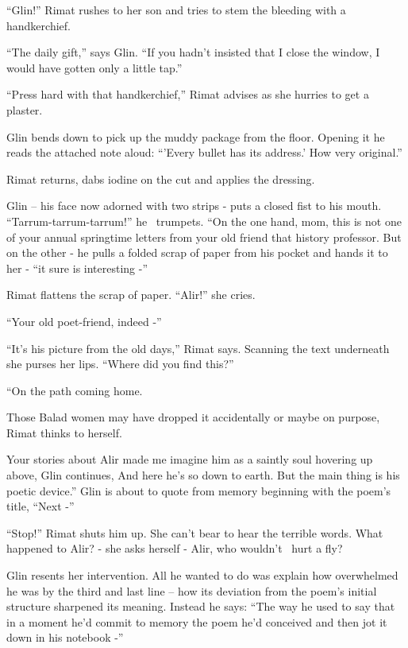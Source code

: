 \documentclass[12pt]{book}
\begin{document}
{{}``Glin!'' Rimat rushes to her son and tries to stem the bleeding
with a handkerchief. }

{{}``The daily gift,'' says Glin. ``If you hadn't insisted }that
{I close the window, I would have gotten only a }little
tap{.'' }

{{}``Press hard with }that
handkerchief,{{}'' Rimat advises as she hurries to get
a}{ }plaster.

{Glin bends down to pick up the muddy
}package{ from the floor. Opening it he reads the attached note aloud:
``'Every bullet has its address.' How }very{
}{original.''}

{Rimat returns, dabs iodine on the cut and }applies the
dressing{. }

{Glin }{}-- his face now adorned with two strips
-{ }{puts }a closed fist
{to his mouth. }{}``Tarrum-tarrum-tarrum!'' he \ trumpets. ``On the
one hand, mom,{ this is not one of your annual springtime letters from
your old friend that}{ }{history professor. But on the
other{\textquotedbl} - he pulls a folded scrap of paper from his pocket and hands it to }her
-{ ``it sure is interesting -'' }

{Rimat flattens the scrap of paper. ``Alir!'' she cries.}

{{}``Your old poet-friend, indeed -''}

{{}``It's his picture from the old days,'' Rimat says. Scanning the
text underneath she purses her lips. ``Where did you find this?'' }

{{}``On the path coming home.{\textquotedbl} }

Those Balad women may have dropped it accidentally or maybe on purpose, Rimat thinks to
herself{. }

{{\textquotedbl}Your stories about Alir made me imagine him as a
saintly soul hovering up above,{\textquotedbl} Glin continues, {\textquotedbl}And here he's so down to earth. But the
main thing is his poetic device.'' Glin is about to quote from memory beginning with the poem's title, ``Next -'' }

{{}``Stop!'' Rimat }shuts him
up{. She can't bear to hear the terrible words. What happened to Alir?
- she asks herself - Alir, who wouldn't~ hurt a fly?}

{Glin }resents her intervention. All he wanted to do
was{ explain how overwhelmed he was by the third and last line -- how
its deviation from the poem's initial structure sharpened its meaning. Instead he says: ``The way he used to say that
in a moment he'd commit to memory the poem }he'd conceived {and then
jot it down in his notebook -'' }
\end{document}

